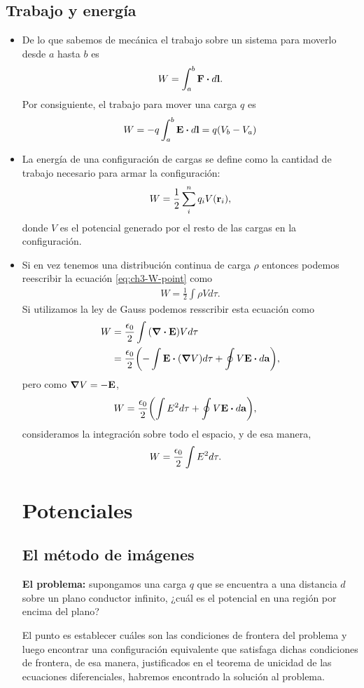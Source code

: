 \subsection{Trabajo y energía}
\begin{itemize}
\item De lo que sabemos de mecánica el trabajo sobre un sistema 
para moverlo desde $a$ hasta $b$ es 
\begin{align}
W=\int_a^b\vb{F}\vdot d\vb{l}.
\end{align}
Por consiguiente, el trabajo para mover una carga $q$ es
\begin{align}
W=-q\int_a^b\vb{E}\vdot d\vb{l}=q\qty(V_b-V_a)
\end{align}

\item La energía de una configuración de cargas se define 
como la cantidad de trabajo necesario para armar la configuración:
\begin{align}
W=\frac{1}{2}\sum_i^nq_iV(\vb{r}_i),
\label{eq:ch3-W-point}
\end{align}
donde $V$ es el potencial generado por el resto de las cargas 
en la configuración.

\item Si en vez tenemos una distribución continua de carga $\rho$
entonces podemos reescribir la ecuación \eqref{eq:ch3-W-point}
como
\begin{align}
W=\frac{1}{2} \int \rho Vd\tau.
\end{align}
Si utilizamos la ley de Gauss podemos resscribir esta ecuación como
\begin{align}
W&=\frac{\ep}{2} \int \qty(\div{\vb{E}}) Vd\tau\nonumber\\
&=\frac{\ep}{2}\qty(-\int \vb{E}\vdot \qty(\grad V)d\tau
+\oint V\vb{E}\vdot d\vb{a}),
\end{align}
pero como $\grad V=-\vb{E}$,
\begin{align}
W&=\frac{\ep}{2}\qty(\int E^2d\tau+\oint V\vb{E}\vdot d\vb{a}),
\end{align}
consideramos la integración sobre todo el espacio, y de esa manera,
\begin{align}
W&=\frac{\epsilon_0}{2}\int E^2d\tau.
\end{align}

\section{Potenciales}
\subsection{El método de imágenes}
\textbf{El problema:} supongamos una carga $q$ que se encuentra a 
una distancia $d$ sobre un plano conductor infinito, ¿cuál es el potencial
en una región por encima del plano?

El punto es establecer cuáles son las condiciones de frontera del problema
y luego encontrar una configuración equivalente que satisfaga dichas 
condiciones de frontera, de esa manera, justificados en el teorema de 
unicidad de las ecuaciones diferenciales, habremos encontrado 
la solución al problema. 
\end{itemize}

